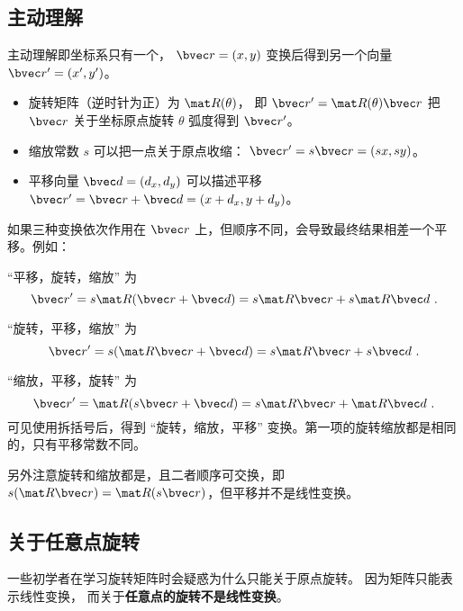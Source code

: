 

\subsection{主动理解}
主动理解即坐标系只有一个， $\bvec r = (x, y)$ 变换后得到另一个向量 $\bvec r' = (x',y')$。

\begin{itemize}
\item 旋转矩阵（逆时针为正）为 $\mat R(\theta)$， 即 $\bvec r' = \mat R(\theta)\bvec r$ 把 $\bvec r$ 关于坐标原点旋转 $\theta$ 弧度得到 $\bvec r'$。
\item 缩放常数 $s$ 可以把一点关于原点收缩： $\bvec r' = s\bvec r = (sx, sy)$。
\item 平移向量 $\bvec d = (d_x,d_y)$ 可以描述平移 $\bvec r' = \bvec r + \bvec d = (x+d_x,y+d_y)$。
\end{itemize}

如果三种变换依次作用在 $\bvec r$ 上，但顺序不同，会导致最终结果相差一个平移。例如：

“平移，旋转，缩放” 为
\begin{equation}
\bvec r' = s\mat R (\bvec r + \bvec d) = s\mat R\bvec r + s\mat R\bvec d~.
\end{equation}

“旋转，平移，缩放” 为
\begin{equation}
\bvec r' = s(\mat R\bvec r + \bvec d) = s\mat R\bvec r + s\bvec d~.
\end{equation}

“缩放，平移，旋转” 为
\begin{equation}
\bvec r' = \mat R(s\bvec r + \bvec d) = s\mat R\bvec r + \mat R\bvec d~.
\end{equation}
可见使用拆括号后，得到 “旋转，缩放，平移” 变换。第一项的旋转缩放都是相同的，只有平移常数不同。

另外注意旋转和缩放都是，且二者顺序可交换，即 $s(\mat R\bvec r) = \mat R (s \bvec r)$，但平移并不是线性变换。

\subsection{关于任意点旋转}
一些初学者在学习旋转矩阵时会疑惑为什么只能关于原点旋转。 因为矩阵只能表示线性变换， 而关于\textbf{任意点的旋转不是线性变换}。

